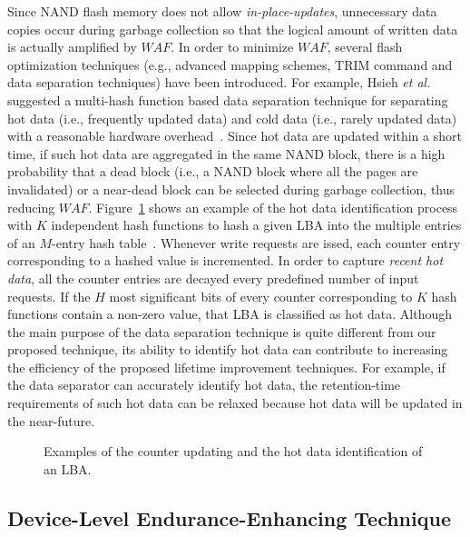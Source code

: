 Since NAND flash memory does not allow \textit{in-place-updates}, unnecessary data copies occur during garbage collection so that the logical amount of written data is actually amplified by $WAF$.
In order to minimize $WAF$, several flash optimization techniques (e.g., advanced mapping schemes, TRIM command and data separation techniques) have been introduced.
For example, Hsieh \textit{et al.} suggested a multi-hash function based data separation technique for separating hot data (i.e., frequently updated data) and cold data (i.e., rarely updated data) with a reasonable hardware overhead~\cite{HotCold_Hsieh}.
Since hot data are updated within a short time, if such hot data are aggregated in the same NAND block, there is a high probability that a dead block (i.e., a NAND block where all the pages are invalidated) or a near-dead block can be selected during garbage collection, thus reducing $WAF$.
Figure~\ref{fig:RelatedWorks_MHF1} shows an example of the hot data identification process with $K$ independent hash functions to hash a given LBA into the multiple entries of an $M$-entry hash table~\cite{HotCold_Hsieh}.
Whenever write requests are issed, each counter entry corresponding to a hashed value is incremented.
In order to capture \textit{recent hot data}, all the counter entries are decayed every predefined number of input requests.
If the $H$ most significant bits of every counter corresponding to $K$ hash functions contain a non-zero value, that LBA is classified as hot data.
Although the main purpose of the data separation technique is quite different from our proposed technique, its ability to identify hot data can contribute to increasing the efficiency of the proposed lifetime improvement techniques.
For example, if the data separator can accurately identify hot data, the retention-time requirements of such hot data can be relaxed because hot data will be updated in the near-future.


\begin{figure}
\centering
\caption{Examples of the counter updating and the hot data identification of an LBA.}
\label{fig:RelatedWorks_MHF1}
\end{figure}


\subsection{Device-Level Endurance-Enhancing Technique}
\label{subsec:Background_ExistingEnduranceEnhancementTechnique}

